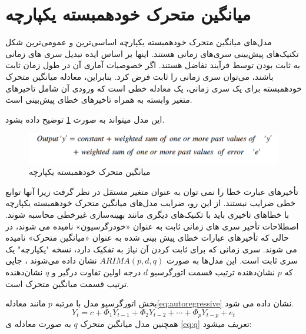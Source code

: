 \section[میانگین خودهمبسته یکپارچه]{میانگین متحرک خودهمبسته یکپارچه\protect{}}
مدل‌های میانگین متحرک خودهمبسته یکپارچه اساسی‌ترین و عمومی‌ترین شکل تکنیک‌های پیش‌بینی سری‌های زمانی هستند. اینها بر اساس ایده تبدیل سری های زمانی به ثابت بودن توسط فرآیند تفاضل هستند. اگر خصوصیات آماری آن در طول زمان ثابت باشند، می‌توان سری زمانی را ثابت فرض کرد. بنابراین، معادله میانگین متحرک خودهمبسته  برای یک سری زمانی، یک معادله خطی است که ورودی آن شامل تاخیرهای متغیر وابسته به همراه تاخیرهای خطای پیش‌بینی است.

این مدل میتواند به صورت \ref{fig:ARIMA} توضیح داده بشود.

\begin{figure}[ht!]
    \begin{center}
        \includegraphics[width=12cm]{images/ARIMA.png}
    \end{center}
    \caption[میانگین متحرک خودهمبسته یکپارچه]{میانگین متحرک خودهمبسته یکپارچه}
    \label{fig:ARIMA}
    \end{figure}

    \noindent
    تأخیرهای عبارت خطا را نمی توان به عنوان متغیر مستقل در نظر گرفت زیرا آنها توابع خطی ضرایب نیستند. از این رو، ضرایب مدل‌های میانگین متحرک خودهمبسته یکپارچه 
    با خطاهای تاخیری باید با تکنیک‌های دیگری مانند بهینه‌سازی غیرخطی محاسبه شوند. اصطلاحات تأخیر سری های زمانی ثابت به عنوان «خودرگرسیون» نامیده می شوند، 
    در حالی که تأخیرهای عبارات خطای پیش بینی شده به عنوان «میانگین متحرک» نامیده می شوند. سری زمانی که برای ثابت کردن آن نیاز به تفکیک دارد،
     نسخه "یکپارچه" یک سری ثابت است.
     این مدل‌ها به صورت $ARIMA (p,d,q)$ نشان داده می‌شوند
    ، جایی که $p$ نشان‌دهنده ترتیب قسمت اتورگرسیو $d$ درجه اولین تفاوت درگیر و $q$ نشان‌دهنده ترتیب قسمت میانگین متحرک است.

    بخش اتورگرسیو مدل با مرتبه $p$ مانند معادله\ref*{eq:autoregressive} نشان داده می شود.
    \begin{equation}\label{eq:autoregressive}
        Y_t = c + \Phi_1 Y_{t-1} + \Phi_2 Y_{t-2} + \cdots + \Phi_p Y_{t-p} + e_t
    \end{equation}
    همچنین مدل میانگین متحرک $q$ به صورت معادله ی \ref{eq:q} تعریف میشود:
    

